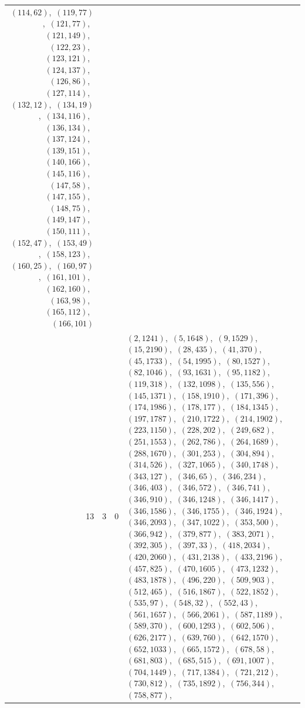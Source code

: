 \documentclass[11pt]{article}
\begin{document}
\begin{longtable}{@{}rrl>{\raggedright\arraybackslash}p{}@{}}
$(114,62)$,\allowbreak\ $(119,77)$,\allowbreak\ $(121,77)$,\allowbreak\ $(121,149)$,\allowbreak\ $(122,23)$,\allowbreak\ $(123,121)$,\allowbreak\ $(124,137)$,\allowbreak\ $(126,86)$,\allowbreak\ $(127,114)$,\allowbreak\ $(132,12)$,\allowbreak\ $(134,19)$,\allowbreak\ $(134,116)$,\allowbreak\ $(136,134)$,\allowbreak\ $(137,124)$,\allowbreak\ $(139,151)$,\allowbreak\ $(140,166)$,\allowbreak\ $(145,116)$,\allowbreak\ $(147,58)$,\allowbreak\ $(147,155)$,\allowbreak\ $(148,75)$,\allowbreak\ $(149,147)$,\allowbreak\ $(150,111)$,\allowbreak\ $(152,47)$,\allowbreak\ $(153,49)$,\allowbreak\ $(158,123)$,\allowbreak\ $(160,25)$,\allowbreak\ $(160,97)$,\allowbreak\ $(161,101)$,\allowbreak\ $(162,160)$,\allowbreak\ $(163,98)$,\allowbreak\ $(165,112)$,\allowbreak\ $(166,101)$\\
13 & 3 & $0$ & $(2,1241)$,\allowbreak\ $(5,1648)$,\allowbreak\ $(9,1529)$,\allowbreak\ $(15,2190)$,\allowbreak\ $(28,435)$,\allowbreak\ $(41,370)$,\allowbreak\ $(45,1733)$,\allowbreak\ $(54,1995)$,\allowbreak\ $(80,1527)$,\allowbreak\ $(82,1046)$,\allowbreak\ $(93,1631)$,\allowbreak\ $(95,1182)$,\allowbreak\ $(119,318)$,\allowbreak\ $(132,1098)$,\allowbreak\ $(135,556)$,\allowbreak\ $(145,1371)$,\allowbreak\ $(158,1910)$,\allowbreak\ $(171,396)$,\allowbreak\ $(174,1986)$,\allowbreak\ $(178,177)$,\allowbreak\ $(184,1345)$,\allowbreak\ $(197,1787)$,\allowbreak\ $(210,1722)$,\allowbreak\ $(214,1902)$,\allowbreak\ $(223,1150)$,\allowbreak\ $(228,202)$,\allowbreak\ $(249,682)$,\allowbreak\ $(251,1553)$,\allowbreak\ $(262,786)$,\allowbreak\ $(264,1689)$,\allowbreak\ $(288,1670)$,\allowbreak\ $(301,253)$,\allowbreak\ $(304,894)$,\allowbreak\ $(314,526)$,\allowbreak\ $(327,1065)$,\allowbreak\ $(340,1748)$,\allowbreak\ $(343,127)$,\allowbreak\ $(346,65)$,\allowbreak\ $(346,234)$,\allowbreak\ $(346,403)$,\allowbreak\ $(346,572)$,\allowbreak\ $(346,741)$,\allowbreak\ $(346,910)$,\allowbreak\ $(346,1248)$,\allowbreak\ $(346,1417)$,\allowbreak\ $(346,1586)$,\allowbreak\ $(346,1755)$,\allowbreak\ $(346,1924)$,\allowbreak\ $(346,2093)$,\allowbreak\ $(347,1022)$,\allowbreak\ $(353,500)$,\allowbreak\ $(366,942)$,\allowbreak\ $(379,877)$,\allowbreak\ $(383,2071)$,\allowbreak\ $(392,305)$,\allowbreak\ $(397,33)$,\allowbreak\ $(418,2034)$,\allowbreak\ $(420,2060)$,\allowbreak\ $(431,2138)$,\allowbreak\ $(433,2196)$,\allowbreak\ $(457,825)$,\allowbreak\ $(470,1605)$,\allowbreak\ $(473,1232)$,\allowbreak\ $(483,1878)$,\allowbreak\ $(496,220)$,\allowbreak\ $(509,903)$,\allowbreak\ $(512,465)$,\allowbreak\ $(516,1867)$,\allowbreak\ $(522,1852)$,\allowbreak\ $(535,97)$,\allowbreak\ $(548,32)$,\allowbreak\ $(552,43)$,\allowbreak\ $(561,1657)$,\allowbreak\ $(566,2061)$,\allowbreak\ $(587,1189)$,\allowbreak\ $(589,370)$,\allowbreak\ $(600,1293)$,\allowbreak\ $(602,506)$,\allowbreak\ $(626,2177)$,\allowbreak\ $(639,760)$,\allowbreak\ $(642,1570)$,\allowbreak\ $(652,1033)$,\allowbreak\ $(665,1572)$,\allowbreak\ $(678,58)$,\allowbreak\ $(681,803)$,\allowbreak\ $(685,515)$,\allowbreak\ $(691,1007)$,\allowbreak\ $(704,1449)$,\allowbreak\ $(717,1384)$,\allowbreak\ $(721,212)$,\allowbreak\ $(730,812)$,\allowbreak\ $(735,1892)$,\allowbreak\ $(756,344)$,\allowbreak\ $(758,877)$,\allowbreak\ 
\end{longtable}
\end{document}
